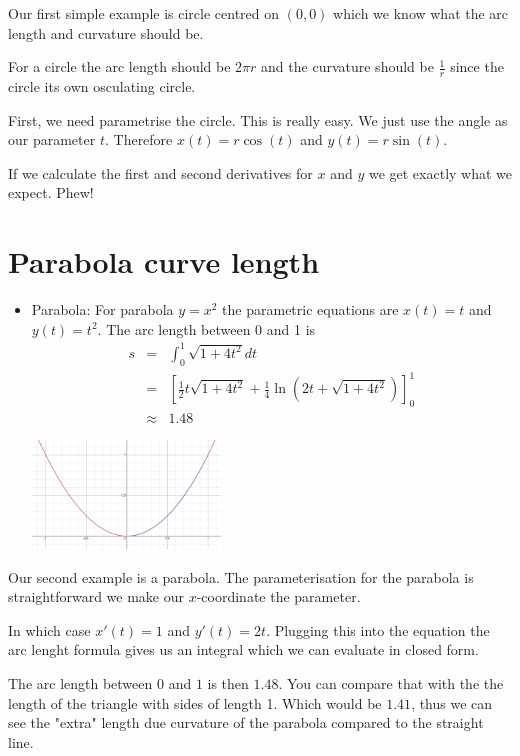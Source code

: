 \documentclass[12pt]{article} %
\theoremstyle{definition}
\theoremstyle{theorem}
\begin{document}
Our first simple example is circle centred on $(0,0)$ which we know what the arc length and curvature should be.

For a circle the arc length should be $2 \pi r$ and the curvature should be $\frac{1}{r}$ since the circle its own osculating circle.

First, we need parametrise the circle. This is really easy. We just use the angle as our parameter $t$. Therefore $x(t)=r \cos(t)$ and $y(t)= r \sin(t)$.

If we calculate the first and second derivatives for $x$ and $y$ we get exactly what we expect. Phew!

\section{Parabola curve length}
\begin{tcolorbox}
	\begin{itemize}			
		\item Parabola: For parabola $y=x^2$ the parametric equations are $x(t)=t$ and $y(t)=t^2$. The arc length between 0 and 1 is 
		\begin{eqnarray*}
			s &=& \int_{0}^{1} \sqrt{1+4t^2}dt \\ &=& \left[\frac{1}{2} t\sqrt{1+ 4 t^2} +\frac{1}{4} \ln \left(2 t+\sqrt{1+ 4 t^2} \right) \right]_{0}^1 \\
			&\approx&	 1.48
		\end{eqnarray*}
	\begin{minipage}{\linewidth}
		\centering
		\includegraphics[width=50mm, scale=0.4]{Parabola_Arc_Length.png}
	\end{minipage}
	\end{itemize}
\end{tcolorbox}

Our second example is a parabola. The parameterisation for the parabola is straightforward we make our $x$-coordinate the parameter. 

In which case $x'(t)=1$ and $y'(t)=2 t$. Plugging this into the equation the arc lenght formula gives us an integral which we can evaluate in closed form.

The arc length between $0$ and $1$ is then $1.48$. You can compare that with the the length of the triangle with sides of length 1. Which would be $1.41$, thus we can see the "extra" length due curvature of the parabola compared to the straight line.
\end{document}
